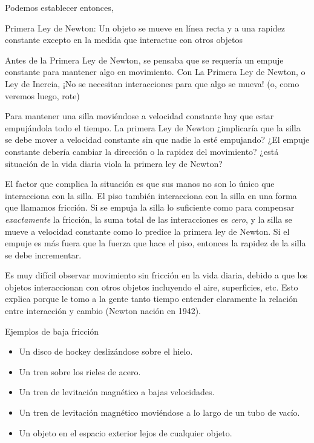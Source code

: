 Podemos establecer entonces,

\begin{frame}
  \begin{block}{Primera Ley de Newton:}
    Un objeto se mueve en línea recta y a una rapidez constante
    excepto en la medida que interactue con otros objetos
  \end{block}
\end{frame}

Antes de la Primera Ley de Newton,  se pensaba que se requería un empuje constante para mantener algo en movimiento. Con La Primera Ley de Newton, o Ley de Inercia, ¡No se necesitan interacciones para que algo se mueva! (o, como veremos luego, rote)


Para mantener una silla moviéndose a velocidad constante hay que estar empujándola todo el tiempo. La primera Ley de Newton ¿implicaría que la silla se debe mover a velocidad constante sin que nadie la esté empujando? ¿El empuje constante debería cambiar la dirección o la rapidez del movimiento? ¿está situación de la vida diaria viola la primera ley de Newton?

El factor que complica la situación es que sus manos no son lo único que interacciona con la silla. El piso también interacciona con la silla en una forma que llamamos fricción. Si se empuja la silla lo suficiente como para compensar \emph{exactamente} la fricción, la suma total de las interacciones es \emph{cero}, y la silla se mueve a velocidad constante como lo predice la primera ley de Newton. Si el empuje es más fuera que la fuerza que hace el piso, entonces la rapidez de la silla se debe incrementar.


Es muy difícil observar movimiento sin fricción en la vida diaria, debido a que los objetos interaccionan con otros objetos incluyendo el aire, superficies, etc. Esto explica porque le tomo a la gente tanto tiempo entender claramente la relación entre interacción y cambio (Newton nación en 1942).

\begin{frame}
Ejemplos de baja fricción
\begin{itemize}
\item Un disco de hockey deslizándose sobre el hielo.
\item Un tren sobre los rieles de acero.
\item Un tren de levitación magnético a bajas velocidades.
\item Un tren de levitación magnético moviéndose a lo largo de un tubo de vacío.
\item Un objeto en el espacio exterior lejos de cualquier objeto.
\end{itemize}
\end{frame}


